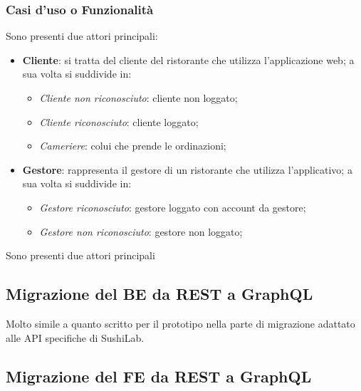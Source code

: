 \subsubsection{Casi d'uso o Funzionalità}
Sono presenti due attori principali:
\begin{itemize}
  \item \textbf{Cliente}: si tratta del cliente del ristorante che utilizza l'applicazione web; a sua volta si suddivide in:
    \begin{itemize}
      \item \textit{Cliente non riconosciuto}: cliente non loggato;
      \item \textit{Cliente riconosciuto}: cliente loggato;
      \item \textit{Cameriere}: colui che prende le ordinazioni;
    \end{itemize}
  \item \textbf{Gestore}: rappresenta il gestore di un ristorante che utilizza l'applicativo; a sua volta si suddivide in:
    \begin{itemize}
      \item \textit{Gestore riconosciuto}: gestore loggato con account da gestore;
      \item \textit{Gestore non riconosciuto}: gestore non loggato;
    \end{itemize}
\end{itemize}

Sono presenti due attori principali
\subsection{Migrazione del BE da REST a GraphQL}
Molto simile a quanto scritto per il prototipo nella parte di migrazione adattato alle API specifiche di SushiLab.
\subsection{Migrazione del FE da REST a GraphQL}




